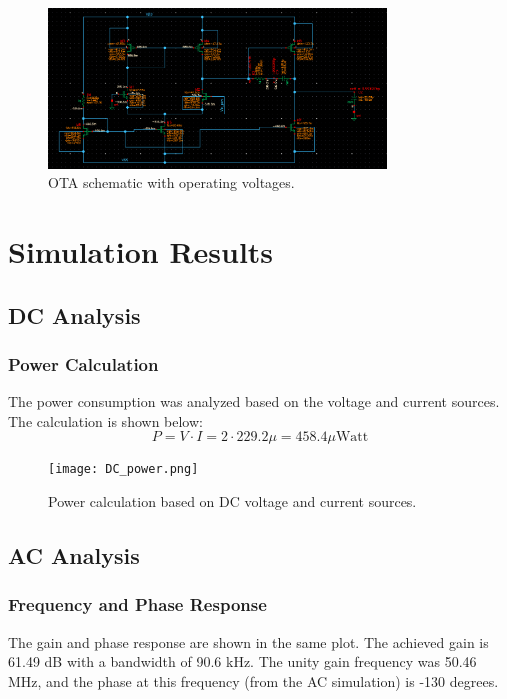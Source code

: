 \documentclass[12pt,a4paper]{article}
\begin{document}
\begin{figure}[H]
    \centering
    \includegraphics[width=0.8\textwidth]{scematic_OTA_DC.png}
    \caption{OTA schematic with operating voltages.}
    \label{fig:ota_voltages}
\end{figure}
\pagebreak

\section*{Simulation Results}



\subsection*{DC Analysis}
\subsubsection*{Power Calculation}
The power consumption was analyzed based on the voltage and current sources. The calculation is shown below:
\begin{equation*}
    P = V \cdot I = 2 \cdot 229.2\mu = 458.4\mu \text{Watt}
\end{equation*}
\begin{figure}[H]
    \centering
    \texttt{[image: DC\_power.png]}
    \caption{Power calculation based on DC voltage and current sources.}
    \label{fig:dc_power}
\end{figure}
\pagebreak
\subsection*{AC Analysis}
\subsubsection*{Frequency and Phase Response}
The gain and phase response are shown in the same plot. The achieved gain is 61.49 dB with a bandwidth of 90.6 kHz. The unity gain frequency was 50.46 MHz, and the phase at this frequency (from the AC simulation) is -130 degrees.
\end{document}
